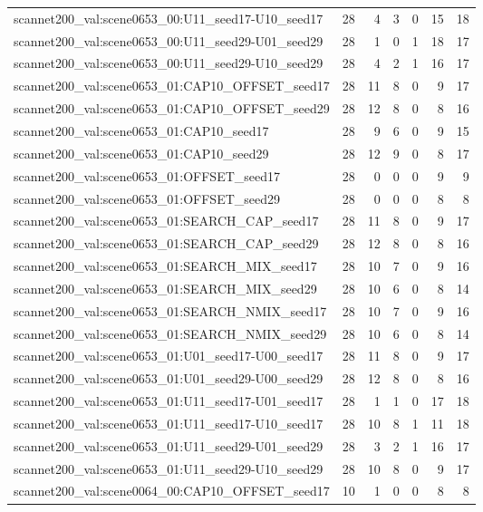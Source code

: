 \begin{table}[t]
\begin{tabular}{lrrrrrr}
scannet200\_val:scene0653\_00:U11\_seed17-U10\_seed17 & 28 & 4 & 3 & 0 & 15 & 18 \\
scannet200\_val:scene0653\_00:U11\_seed29-U01\_seed29 & 28 & 1 & 0 & 1 & 18 & 17 \\
scannet200\_val:scene0653\_00:U11\_seed29-U10\_seed29 & 28 & 4 & 2 & 1 & 16 & 17 \\
scannet200\_val:scene0653\_01:CAP10\_OFFSET\_seed17 & 28 & 11 & 8 & 0 & 9 & 17 \\
scannet200\_val:scene0653\_01:CAP10\_OFFSET\_seed29 & 28 & 12 & 8 & 0 & 8 & 16 \\
scannet200\_val:scene0653\_01:CAP10\_seed17 & 28 & 9 & 6 & 0 & 9 & 15 \\
scannet200\_val:scene0653\_01:CAP10\_seed29 & 28 & 12 & 9 & 0 & 8 & 17 \\
scannet200\_val:scene0653\_01:OFFSET\_seed17 & 28 & 0 & 0 & 0 & 9 & 9 \\
scannet200\_val:scene0653\_01:OFFSET\_seed29 & 28 & 0 & 0 & 0 & 8 & 8 \\
scannet200\_val:scene0653\_01:SEARCH\_CAP\_seed17 & 28 & 11 & 8 & 0 & 9 & 17 \\
scannet200\_val:scene0653\_01:SEARCH\_CAP\_seed29 & 28 & 12 & 8 & 0 & 8 & 16 \\
scannet200\_val:scene0653\_01:SEARCH\_MIX\_seed17 & 28 & 10 & 7 & 0 & 9 & 16 \\
scannet200\_val:scene0653\_01:SEARCH\_MIX\_seed29 & 28 & 10 & 6 & 0 & 8 & 14 \\
scannet200\_val:scene0653\_01:SEARCH\_NMIX\_seed17 & 28 & 10 & 7 & 0 & 9 & 16 \\
scannet200\_val:scene0653\_01:SEARCH\_NMIX\_seed29 & 28 & 10 & 6 & 0 & 8 & 14 \\
scannet200\_val:scene0653\_01:U01\_seed17-U00\_seed17 & 28 & 11 & 8 & 0 & 9 & 17 \\
scannet200\_val:scene0653\_01:U01\_seed29-U00\_seed29 & 28 & 12 & 8 & 0 & 8 & 16 \\
scannet200\_val:scene0653\_01:U11\_seed17-U01\_seed17 & 28 & 1 & 1 & 0 & 17 & 18 \\
scannet200\_val:scene0653\_01:U11\_seed17-U10\_seed17 & 28 & 10 & 8 & 1 & 11 & 18 \\
scannet200\_val:scene0653\_01:U11\_seed29-U01\_seed29 & 28 & 3 & 2 & 1 & 16 & 17 \\
scannet200\_val:scene0653\_01:U11\_seed29-U10\_seed29 & 28 & 10 & 8 & 0 & 9 & 17 \\
scannet200\_val:scene0064\_00:CAP10\_OFFSET\_seed17 & 10 & 1 & 0 & 0 & 8 & 8 \\

\end{tabular}
\end{table}
